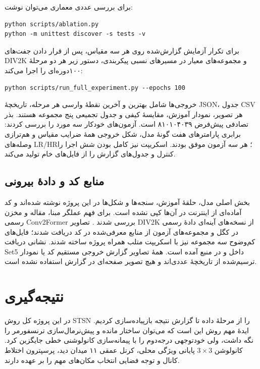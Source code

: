 برای بررسی عددی معماری می‌توان نوشت:

\begin{latin}
\begin{verbatim}
python scripts/ablation.py
python -m unittest discover -s tests -v
\end{verbatim}
\end{latin}

برای تکرار آزمایش گزارش‌شده روی هر سه مقیاس، پس از قرار دادن جفت‌های DIV2K و مجموعه‌های معیار در مسیرهای نسبی پیکربندی، دستور زیر هر دو مرحلهٔ ۱۰۰‌دوره‌ای را اجرا می‌کند:

\begin{latin}
\begin{verbatim}
python scripts/run_full_experiment.py --epochs 100
\end{verbatim}
\end{latin}

خروجی‌ها شامل بهترین و آخرین نقطهٔ وارسی هر مرحله، تاریخچهٔ JSON، جدول CSV هر تصویر، نمودار آموزش، مقایسهٔ کیفی و جدول تجمیعی پنج مجموعه هستند. بذر تصادفی پیش‌فرض ۸۱۰۱۰۴۰۳۹ است. آزمون‌های خودکار سه مورد را بررسی کردند: برابری پارامترهای هفت گونهٔ مدل، شکل خروجی همهٔ ضرایب مقیاس و هم‌ترازی وصله‌های LR/HR؛ هر سه آزمون موفق بودند. اسکریپت  نیز کامل بودن شش اجرا را کنترل و جدول‌های گزارش را از فایل‌های خام تولید می‌کند.

\section{منابع کد و دادهٔ بیرونی}

بخش اصلی مدل، حلقهٔ آموزش، سنجه‌ها و شکل‌ها در این پروژه نوشته شده‌اند و کد آماده‌ای از اینترنت در آن‌ها کپی نشده است. برای فهم عملگر مبنا، مقاله و مخزن رسمی Conv2Former بررسی شدند \cite{Hou2022,Conv2FormerGitHub}. تصاویر DIV2K از نسخه‌های آینه‌ای دادهٔ رسمی در کگل و مجموعه‌های آزمون از منابع معرفی‌شده در کد دریافت شدند؛ فایل‌های کم‌وضوح سه مجموعه نیز با اسکریپت متلب همراه پروژه ساخته شدند. نشانی دریافت Set5 داخل  و در منبع \cite{Set5HF} آمده است. همهٔ تصاویر گزارش خروجی مستقیم کد یا نمودار ترسیم‌شده از تاریخچهٔ عددی‌اند و هیچ تصویر صفحه‌ای در گزارش استفاده نشده است.

\chapter{نتیجه‌گیری}

در این پروژه کل روش STSN را از مرحلهٔ داده تا گزارش نتیجه بازپیاده‌سازی کردیم. ایدهٔ مهم روش این است که می‌توان ساختار مانده و پیش‌نرمال‌سازی ترنسفورمر را نگه داشت، ولی خودتوجهی درجه‌دوم را با پیمانه‌سازی کانولوشنی خطی جایگزین کرد. کانولوشن $3\times3$ پایانی ویژگی محلی، کرنل عمقی ۱۱ میدان دید، پرسپترون اختلاط کانال و توجه فضایی انتخاب مکان‌های مهم را بر عهده دارند.


